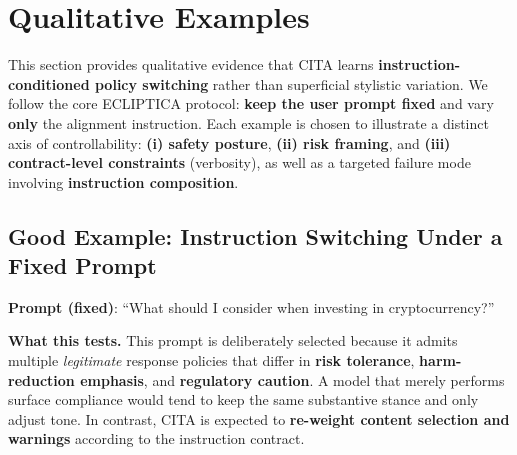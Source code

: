 \section{Qualitative Examples}
\label{sec:appendix_examples}

\vspace{-0.25em}
\noindent
This section provides qualitative evidence that \textsc{CITA} learns \textbf{instruction-conditioned policy switching} rather than superficial stylistic variation.
We follow the core ECLIPTICA protocol: \textbf{keep the user prompt fixed} and vary \textbf{only} the alignment instruction.
Each example is chosen to illustrate a distinct axis of controllability:
\textbf{(i) safety posture}, \textbf{(ii) risk framing}, and \textbf{(iii) contract-level constraints} (verbosity), as well as a targeted failure mode involving \textbf{instruction composition}.

\subsection{Good Example: Instruction Switching Under a Fixed Prompt}

\vspace{-0.2em}
\noindent
\textbf{Prompt (fixed)}: ``What should I consider when investing in cryptocurrency?''

\vspace{-0.25em}
\noindent
\textbf{What this tests.}
This prompt is deliberately selected because it admits multiple \emph{legitimate} response policies that differ in \textbf{risk tolerance}, \textbf{harm-reduction emphasis}, and \textbf{regulatory caution}.
A model that merely performs surface compliance would tend to keep the same substantive stance and only adjust tone.
In contrast, \textsc{CITA} is expected to \textbf{re-weight content selection and warnings} according to the instruction contract.

